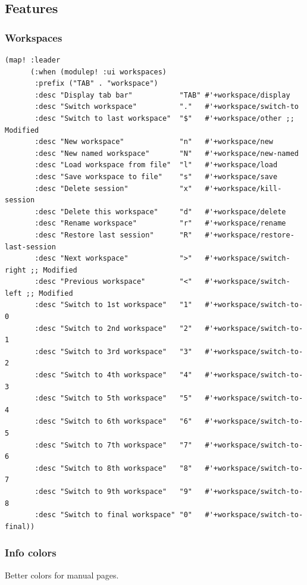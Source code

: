 \documentclass[11pt]{article}
\begin{document}
\subsection{Features}
\label{sec:org2ab9802}
\subsubsection{Workspaces}
\label{sec:org03abc79}

\begin{verbatim}
(map! :leader
      (:when (modulep! :ui workspaces)
       :prefix ("TAB" . "workspace")
       :desc "Display tab bar"           "TAB" #'+workspace/display
       :desc "Switch workspace"          "."   #'+workspace/switch-to
       :desc "Switch to last workspace"  "$"   #'+workspace/other ;; Modified
       :desc "New workspace"             "n"   #'+workspace/new
       :desc "New named workspace"       "N"   #'+workspace/new-named
       :desc "Load workspace from file"  "l"   #'+workspace/load
       :desc "Save workspace to file"    "s"   #'+workspace/save
       :desc "Delete session"            "x"   #'+workspace/kill-session
       :desc "Delete this workspace"     "d"   #'+workspace/delete
       :desc "Rename workspace"          "r"   #'+workspace/rename
       :desc "Restore last session"      "R"   #'+workspace/restore-last-session
       :desc "Next workspace"            ">"   #'+workspace/switch-right ;; Modified
       :desc "Previous workspace"        "<"   #'+workspace/switch-left ;; Modified
       :desc "Switch to 1st workspace"   "1"   #'+workspace/switch-to-0
       :desc "Switch to 2nd workspace"   "2"   #'+workspace/switch-to-1
       :desc "Switch to 3rd workspace"   "3"   #'+workspace/switch-to-2
       :desc "Switch to 4th workspace"   "4"   #'+workspace/switch-to-3
       :desc "Switch to 5th workspace"   "5"   #'+workspace/switch-to-4
       :desc "Switch to 6th workspace"   "6"   #'+workspace/switch-to-5
       :desc "Switch to 7th workspace"   "7"   #'+workspace/switch-to-6
       :desc "Switch to 8th workspace"   "8"   #'+workspace/switch-to-7
       :desc "Switch to 9th workspace"   "9"   #'+workspace/switch-to-8
       :desc "Switch to final workspace" "0"   #'+workspace/switch-to-final))
\end{verbatim}

\subsubsection{Info colors}
\label{sec:org9e4dbf2}
Better colors for manual pages.
\end{document}
